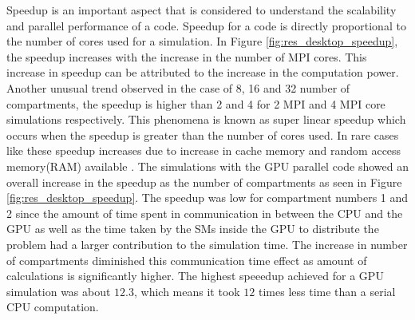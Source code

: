 \documentclass[preprint,10pt,authoryear,review]{elsarticle}
\begin{document}
\begin{linenumbers}
Speedup is an important aspect that is considered to understand the scalability and 
parallel performance of a code. Speedup for a code is directly proportional 
to the number of cores used for a simulation. 
In Figure \ref{fig:res_desktop_speedup}, the speedup increases with the increase in 
the number of MPI cores. This increase in speedup can be attributed to the increase 
in the computation power. Another unusual trend observed in the case of 8, 16 and 
32 number of compartments, the speedup is higher than 2 and 4 for 2 MPI and 4 MPI core simulations respectively. This phenomena is known as super linear speedup which occurs 
when the speedup is greater than the number of cores used. In rare cases like these
speedup increases due to increase in cache memory and random access memory(RAM) 
available \citep{tuncer2009}. The simulations with the GPU parallel code showed an 
overall increase in the speedup as the number of compartments as seen in Figure 
\ref{fig:res_desktop_speedup}. The speedup was low for compartment numbers 1 and 2 
since the amount of time spent in communication in between the CPU and the GPU as well 
as the time taken by the SMs inside the GPU to distribute the problem had a larger 
contribution to the simulation time. The increase in number of compartments diminished 
this communication time effect as amount of calculations is significantly higher. The 
highest speeedup achieved for a GPU simulation was about $12.3$, which means it took 
$12$ times less time than a serial CPU computation. 



\end{linenumbers}
\end{document}
